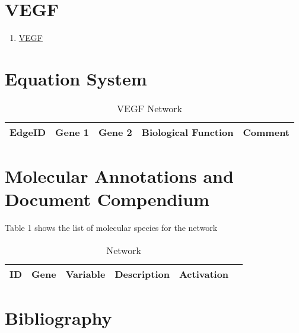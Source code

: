 
\section{VEGF}

\begin{enumerate}
\item \href{https://www.genome.jp/kegg-bin/show_pathway?map=hsa04012&show_description=show}{VEGF}
\end{enumerate}

\section{Equation System}


\begin{table}[H]
	\tiny
	\begin{tabular}{p{1cm}p{1cm}p{3cm}p{1cm}p{1cm}} 
		EdgeID & Gene 1 & Gene 2 & Biological Function & Comment \\
		\hline
    
    \end{tabular}
	\caption{VEGF Network}
	\label{tab:Table2}
\end{table}


\section{Molecular Annotations and Document Compendium}

Table 1 shows the list of molecular species for the network
\vspace{8pt}
\begin{table}[H]
	\begin{tabular}{rlllll}
		\hline
		ID & Gene & Variable & Description & Activation \\ 
		\hline

		\hline
	\end{tabular}
	\caption{Network}
	\label{tab:Table2}
\end{table}

\section{Bibliography}

